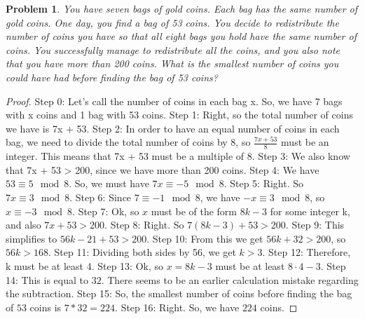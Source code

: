 \documentclass{article}
\newtheorem{theorem}{Problem}
\begin{document}
\begin{theorem}
You have seven bags of gold coins. Each bag has the same number of gold coins. One day, you find a bag of 53 coins. You decide to redistribute the number of coins you have so that all eight bags you hold have the same number of coins. You successfully manage to redistribute all the coins, and you also note that you have more than 200 coins. What is the smallest number of coins you could have had before finding the bag of 53 coins?
\end{theorem}

\begin{proof}
Step 0: Let's call the number of coins in each bag x. So, we have 7 bags with x coins and 1 bag with 53 coins.
Step 1: Right, so the total number of coins we have is 7x + 53.
Step 2: In order to have an equal number of coins in each bag, we need to divide the total number of coins by 8, so $\frac{7x+53}{8}$ must be an integer. This means that 7x + 53 must be a multiple of 8.
Step 3: We also know that 7x + 53 > 200, since we have more than 200 coins.
Step 4: We have $53\equiv5\mod{8}$. So, we must have $7x\equiv-5\mod{8}$.
Step 5: Right. So $7x\equiv3\mod{8}$.
Step 6: Since $7\equiv-1\mod{8}$, we have $-x\equiv3\mod{8}$, so $x\equiv-3\mod{8}$.
Step 7: Ok, so $x$ must be of the form $8k-3$ for some integer k, and also $7x+53>200$.
Step 8: Right. So $7(8k-3) + 53 > 200$.
Step 9: This simplifies to $56k - 21 + 53 > 200$.
Step 10: From this we get $56k + 32 > 200$, so $56k > 168$.
Step 11: Dividing both sides by 56, we get $k > 3$.
Step 12: Therefore, k must be at least 4.
Step 13: Ok, so $x = 8k - 3$ must be at least $8\cdot4 - 3$.
Step 14: This is equal to $32$. There seems to be an earlier calculation mistake regarding the subtraction.
Step 15: So, the smallest number of coins before finding the bag of $53$ coins is $7*32=224$.
Step 16: Right. So, we have $224$ coins.
\end{proof}
\end{document}
